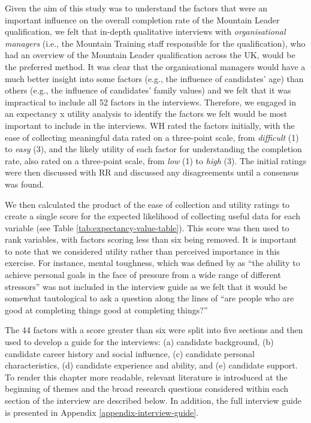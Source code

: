 \documentclass[
  12pt,
  a4paper,
]{book}
\begin{document}
Given the aim of this study was to understand the factors that were an important influence on the overall completion rate of the Mountain Leader qualification, we felt that in-depth qualitative interviews with \emph{organisational managers} (i.e., the Mountain Training staff responsible for the qualification), who had an overview of the Mountain Leader qualification across the UK, would be the preferred method. It was clear that the organisational managers would have a much better insight into some factors (e.g., the influence of candidates' age) than others (e.g., the influence of candidates' family values) and we felt that it was impractical to include all 52 factors in the interviews. Therefore, we engaged in an expectancy x utility analysis to identify the factors we felt would be most important to include in the interviews. WH rated the factors initially, with the ease of collecting meaningful data rated on a three-point scale, from \emph{difficult} (1) to \emph{easy} (3), and the likely utility of each factor for understanding the completion rate, also rated on a three-point scale, from \emph{low} (1) to \emph{high} (3). The initial ratings were then discussed with RR and discussed any disagreements until a consensus was found.

We then calculated the product of the ease of collection and utility ratings to create a single score for the expected likelihood of collecting useful data for each variable (see Table \ref{tab:expectancy-value-table}). This score was then used to rank variables, with factors scoring less than six being removed. It is important to note that we considered utility rather than perceived importance in this exercise. For instance, mental toughness, which was defined by \citet{Bell2013} as ``the ability to achieve personal goals in the face of pressure from a wide range of different stressors'' was not included in the interview guide as we felt that it would be somewhat tautological to ask a question along the lines of ``are people who are good at completing things good at completing things?''

The 44 factors with a score greater than six were split into five sections and then used to develop a guide for the interviews: (a) candidate background, (b) candidate career history and social influence, (c) candidate personal characteristics, (d) candidate experience and ability, and (e) candidate support. To render this chapter more readable, relevant literature is introduced at the beginning of themes and the broad research questions considered within each section of the interview are described below. In addition, the full interview guide is presented in Appendix \ref{appendix-interview-guide}.
\end{document}
